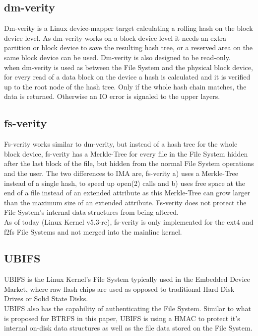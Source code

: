 \documentclass[10pt]{article}
\begin{document}
\subsection{dm-verity}
Dm-verity is a Linux device-mapper target calculating a rolling hash on the
block device level. As dm-verity works on a block device level it needs an
extra partition or block device to save the resulting hash tree, or a reserved
area on the same block device can be used. Dm-verity is also designed to be
read-only.\\
when dm-verity is used as between the File System and the physical block
device, for every read of a data block on the device a hash is calculated and
it is verified up to the root node of the hash tree. Only if the whole hash
chain matches, the data is returned. Otherwise an IO error is signaled to the
upper layers.

\subsection{fs-verity}
Fs-verity\cite{FS-VERITY} works similar to dm-verity, but instead of a hash
tree for the whole block device, fs-verity has a Merkle-Tree for every file in
the File System hidden after the last block of the file, but hidden from the
normal File System operations and the user. The two differences to IMA are,
fs-verity a) uses a Merkle-Tree instead of a single hash, to speed up open(2)
calls and b) uses free space at the end of a file instead of an extended
attribute as this Merkle-Tree can grow larger than the maximum size of an
extended attribute. Fs-verity does not protect the File System's internal data
structures from being altered.\\
As of today (Linux Kernel v5.3-rc), fs-verity is only implemented for the ext4
and f2fs File Systems and not merged into the mainline kernel.

\subsection{UBIFS}
UBIFS\cite{UBIFS} is the Linux Kernel's File System typically used in the
Embedded Device Market, where raw flash chips are used as opposed to
traditional Hard Disk Drives or Solid State Disks.\\ UBIFS also has the
capability of authenticating the File System. Similar to what is proposed for
BTRFS in this paper, UBIFS is using a HMAC to protect it's internal on-disk
data structures as well as the file data stored on the File System.
\end{document}
